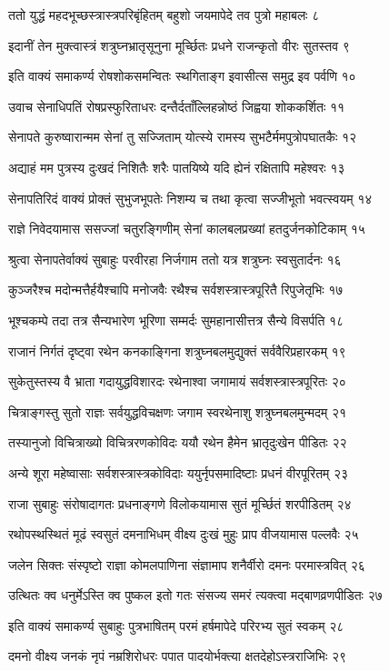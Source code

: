 ततो युद्धं महदभूच्छस्त्रास्त्रपरिबृंहितम्
बहुशो जयमापेदे तव पुत्रो महाबलः ८

इदानीं तेन मुक्त्वास्त्रं शत्रुघ्नभ्रातृसूनुना
मूर्च्छितः प्रधने राजन्कृतो वीरः सुतस्तव ९

इति वाक्यं समाकर्ण्य रोषशोकसमन्वितः
स्थगिताङ्ग इवासीत्स समुद्र इव पर्वणि १०

उवाच सेनाधिपतिं रोषप्रस्फुरिताधरः
दन्तैर्दताँल्लिहन्नोष्ठं जिह्वया शोककर्शितः ११

सेनापते कुरुष्वारान्मम सेनां तु सज्जिताम्
योत्स्ये रामस्य सुभटैर्ममपुत्रोपघातकैः १२

अद्याहं मम पुत्रस्य दुःखदं निशितैः शरैः
पातयिष्ये यदि ह्येनं रक्षितापि महेश्वरः १३

सेनापतिरिदं वाक्यं प्रोक्तं सुभुजभूपतेः
निशम्य च तथा कृत्वा सज्जीभूतो भवत्स्वयम् १४

राज्ञे निवेदयामास ससज्जां चतुरङ्गिणीम्
सेनां कालबलप्रख्यां हतदुर्जनकोटिकाम् १५

श्रुत्वा सेनापतेर्वाक्यं सुबाहुः परवीरहा
निर्जगाम ततो यत्र शत्रुघ्नः स्वसुतार्दनः १६

कुञ्जरैश्च मदोन्मत्तैर्हयैश्चापि मनोजवैः
रथैश्च सर्वशस्त्रास्त्रपूरितै रिपुजेतृभिः १७

भूश्चकम्पे तदा तत्र सैन्यभारेण भूरिणा
सम्मर्दः सुमहानासीत्तत्र सैन्ये विसर्पति १८

राजानं निर्गतं दृष्ट्वा रथेन कनकाङ्गिना
शत्रुघ्नबलमुद्युक्तं सर्ववैरिप्रहारकम् १९

सुकेतुस्तस्य वै भ्राता गदायुद्धविशारदः
रथेनाश्वा जगामायं सर्वशस्त्रास्त्रपूरितः २०

चित्राङ्गस्तु सुतो राज्ञः सर्वयुद्धविचक्षणः
जगाम स्वरथेनाशु शत्रुघ्नबलमुन्मदम् २१

तस्यानुजो विचित्राख्यो विचित्ररणकोविदः
ययौ रथेन हैमेन भ्रातृदुःखेन पीडितः २२

अन्ये शूरा महेष्वासाः सर्वशस्त्रास्त्रकोविदाः
ययुर्नृपसमादिष्टाः प्रधनं वीरपूरितम् २३

राजा सुबाहुः संरोषादागतः प्रधनाङ्गणे
विलोकयामास सुतं मूर्च्छितं शरपीडितम् २४

रथोपस्थस्थितं मूढं स्वसुतं दमनाभिधम्
वीक्ष्य दुःखं मुहुः प्राप वीजयामास पल्लवैः २५

जलेन सिक्तः संस्पृष्टो राज्ञा कोमलपाणिना
संज्ञामाप शनैर्वीरो दमनः परमास्त्रवित् २६

उत्थितः क्व धनुर्मेऽस्ति क्व पुष्कल इतो गतः
संसज्य समरं त्यक्त्वा मद्बाणव्रणपीडितः २७

इति वाक्यं समाकर्ण्य सुबाहुः पुत्रभाषितम्
परमं हर्षमापेदे परिरभ्य सुतं स्वकम् २८

दमनो वीक्ष्य जनकं नृपं नम्रशिरोधरः
पपात पादयोर्भक्त्या क्षतदेहोऽस्त्रराजिभिः २९

